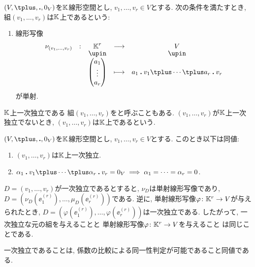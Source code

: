\begin{definition}
  $(V,\plus,\act,0_V)$を$\mathbb{K}$線形空間とし,
  $v_1,\ldots,v_r\in V$とする.
  次の条件を満たすとき,
  組$(v_1,\ldots,v_r)$は$\mathbb{K}$上であるという:
\begin{enumerate}
  \item 線形写像
    \begin{align*}
      \shazo{\nu_{(v_1,\ldots,v_r)}}{\KK^r}{V}
      {\begin{pmatrix}a_1\\\vdots\\a_r\end{pmatrix}}{a_1\act v_1\plus\cdots\plus a_r\act v_r}
    \end{align*}
    が単射.
  \end{enumerate}
  $\mathbb{K}$上一次独立である
  組$(v_1,\ldots,v_r)$をと呼ぶこともある.
  $(v_1,\ldots,v_r)$が$\mathbb{K}$上一次独立でないとき,
  $(v_1,\ldots,v_r)$は$\mathbb{K}$上であるという.
\end{definition}

\begin{prop}
  $(V,\plus,\act,0_V)$を$\mathbb{K}$線形空間とし,
  $v_1,\ldots,v_r\in V$とする.
  このとき以下は同値:
  \begin{enumerate}
  \item $(v_1,\ldots,v_r)$は$\mathbb{K}$上一次独立.
  \item $\alpha_1\act v_1\plus\cdots\plus \alpha_r\act v_r=0_V \implies \alpha_1=\cdots=\alpha_r=0$.
  \end{enumerate}
\end{prop}

\begin{remark}
  $D=(v_1,\ldots,v_r)$が一次独立であるとすると,
  $\nu_D$は単射線形写像であり,
  $D=(\nu_D(\ee^{(r)}_1),\ldots,\mu_D(\ee^{(r)}_r))$である.
  逆に, 単射線形写像$\varphi\colon \mathbb{K}^r\to V$が与えられたとき,
  $D=(\varphi(\ee^{(r)}_1),\ldots,\varphi(\ee^{(r)}_r))$は一次独立である.
  したがって,
  一次独立な元の組を与えることと
  単射線形写像$\varphi\colon \mathbb{K}^r\to V$を与えること
  は同じことである.
\end{remark}

一次独立であることは,
係数の比較による同一性判定が可能であること同値である.

